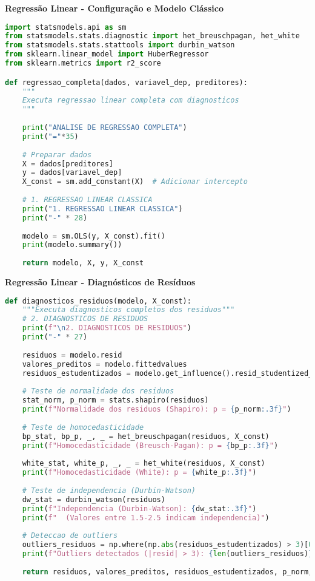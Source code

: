 \begin{examplebox}
\textbf{Regressão Linear - Configuração e Modelo Clássico}

\begin{lstlisting}[language=Python]
import statsmodels.api as sm
from statsmodels.stats.diagnostic import het_breuschpagan, het_white
from statsmodels.stats.stattools import durbin_watson
from sklearn.linear_model import HuberRegressor
from sklearn.metrics import r2_score

def regressao_completa(dados, variavel_dep, preditores):
    """
    Executa regressao linear completa com diagnosticos
    """
    
    print("ANALISE DE REGRESSAO COMPLETA")
    print("="*35)
    
    # Preparar dados
    X = dados[preditores]
    y = dados[variavel_dep]
    X_const = sm.add_constant(X)  # Adicionar intercepto
    
    # 1. REGRESSAO LINEAR CLASSICA
    print("1. REGRESSAO LINEAR CLASSICA")
    print("-" * 28)
    
    modelo = sm.OLS(y, X_const).fit()
    print(modelo.summary())
    
    return modelo, X, y, X_const
\end{lstlisting}
\end{examplebox}

\begin{examplebox}
\textbf{Regressão Linear - Diagnósticos de Resíduos}

\begin{lstlisting}[language=Python]
def diagnosticos_residuos(modelo, X_const):
    """Executa diagnosticos completos dos residuos"""
    # 2. DIAGNOSTICOS DE RESIDUOS
    print(f"\n2. DIAGNOSTICOS DE RESIDUOS")
    print("-" * 27)
    
    residuos = modelo.resid
    valores_preditos = modelo.fittedvalues
    residuos_estudentizados = modelo.get_influence().resid_studentized_external
    
    # Teste de normalidade dos residuos
    stat_norm, p_norm = stats.shapiro(residuos)
    print(f"Normalidade dos residuos (Shapiro): p = {p_norm:.3f}")
    
    # Teste de homocedasticidade
    bp_stat, bp_p, _, _ = het_breuschpagan(residuos, X_const)
    print(f"Homocedasticidade (Breusch-Pagan): p = {bp_p:.3f}")
    
    white_stat, white_p, _, _ = het_white(residuos, X_const)
    print(f"Homocedasticidade (White): p = {white_p:.3f}")
    
    # Teste de independencia (Durbin-Watson)
    dw_stat = durbin_watson(residuos)
    print(f"Independencia (Durbin-Watson): {dw_stat:.3f}")
    print(f"  (Valores entre 1.5-2.5 indicam independencia)")
    
    # Deteccao de outliers
    outliers_residuos = np.where(np.abs(residuos_estudentizados) > 3)[0]
    print(f"Outliers detectados (|resid| > 3): {len(outliers_residuos)}")
    
    return residuos, valores_preditos, residuos_estudentizados, p_norm, bp_p, white_p, dw_stat, outliers_residuos
\end{lstlisting}
\end{examplebox}

